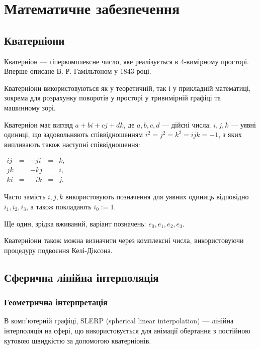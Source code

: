 \section{Математичне забезпечення}

\subsection{Кватерніони}

Кватерніон  — гіперкомплексне число, яке реалізується в 4-вимірному просторі. Вперше описане В. Р. Гамільтоном у 1843 році.

Кватерніони використовуються як у теоретичній, так і у прикладній математиці, зокрема для розрахунку поворотів у просторі у тривимірній графіці та машинному зорі.

Кватерніон має вигляд $a + bi + cj + dk$, де $a, b, c, d$ — дійсні числа;
$i, j, k$ — уявні одиниці, що задовольняють співвідношенням
$i^2 = j^2 = k^2 = ijk = -1$, з яких випливають також наступні співвідношення: \\
\begin{center}
  $\begin{matrix}
    ij & = & -ji & = & k, \\
    jk & = & -kj & = & i, \\
    ki & = & -ik & = & j.
  \end{matrix}$
\end{center}

Часто замість $i, j, k$ використовують позначення для уявних одиниць відповідно $i_1, i_2, i_3$, а також покладають $i_0 := 1$.

Ще один, зрідка вживаний, варіант позначень: $e_0, e_1, e_2, e_3$.

Кватерніони також можна визначити через комплексні числа, використовуючи процедуру подвоєння Келі-Діксона.

\subsection{Сферична лінійна інтерполяція}

\subsubsection{Геометрична інтерпретація}
В комп'ютерній графіці, SLERP (spherical linear interpolation) — лінійна інтерполяція на сфері, що використовується для анімації обертання з постійною кутовою швидкістю за допомогою кватерніонів.

